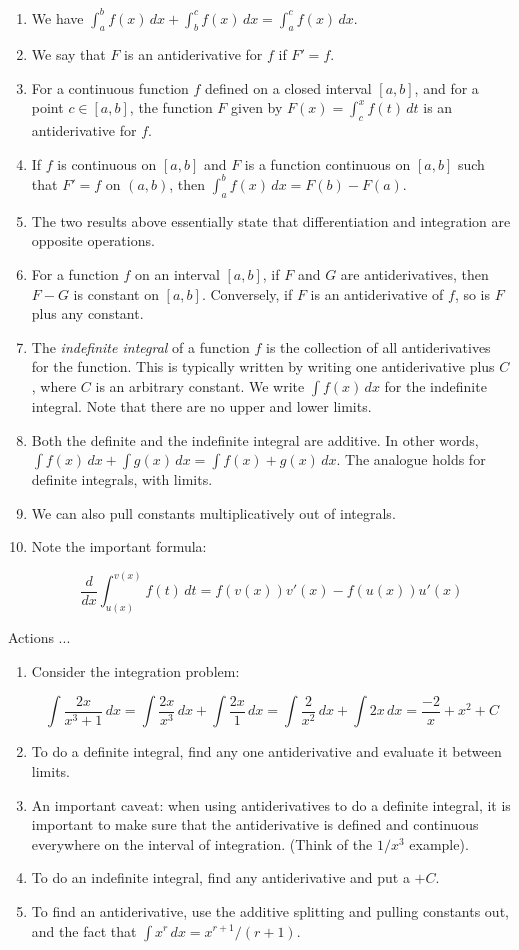 \documentclass[10pt]{amsart}
\begin{document}
\begin{enumerate}
\item We have $\int_a^b f(x) \, dx + \int_b^c f(x) \, dx = \int_a^c
  f(x) \, dx$.
\item We say that $F$ is an antiderivative for $f$ if $F' = f$.
\item For a continuous function $f$ defined on a closed interval
  $[a,b]$, and for a point $c \in [a,b]$, the function $F$ given by
  $F(x) = \int_c^x f(t) \, dt$ is an antiderivative for $f$.
\item If $f$ is continuous on $[a,b]$ and $F$ is a function continuous
  on $[a,b]$ such that $F' = f$ on $(a,b)$, then $\int_a^b f(x) \, dx
  = F(b) - F(a)$.
\item The two results above essentially state that differentiation and
  integration are opposite operations.
\item For a function $f$ on an interval $[a,b]$, if $F$ and $G$ are
  antiderivatives, then $F - G$ is constant on $[a,b]$. Conversely, if
  $F$ is an antiderivative of $f$, so is $F$ plus any constant.
\item The {\em indefinite integral} of a function $f$ is the
  collection of all antiderivatives for the function. This is
  typically written by writing one antiderivative plus $C$, where $C$
  is an arbitrary constant. We write $\int f(x) \, dx$ for the
  indefinite integral. Note that there are no upper and lower limits.
\item Both the definite and the indefinite integral are additive. In
  other words, $\int f(x) \, dx + \int g(x) \, dx = \int f(x) + g(x)
  \, dx$. The analogue holds for definite integrals, with limits.
\item We can also pull constants multiplicatively out of integrals.
\item Note the important formula:

  $$\frac{d}{dx} \int_{u(x)}^{v(x)} f(t) \, dt = f(v(x))v'(x) - f(u(x))u'(x)$$
\end{enumerate}

Actions ...

\begin{enumerate}
\item Consider the integration problem:

  $$\int \frac{2x}{x^3 + 1} \, dx = \int \frac{2x}{x^3} \, dx + \int \frac{2x}{1} \, dx = \int \frac{2}{x^2} \, dx + \int 2x \, dx = \frac{-2}{x} + x^2 + C$$
\item To do a definite integral, find any one antiderivative and
  evaluate it between limits.
\item An important caveat: when using antiderivatives to do a definite
  integral, it is important to make sure that the antiderivative is
  defined and continuous everywhere on the interval of
  integration. (Think of the $1/x^3$ example). 
\item To do an indefinite integral, find any antiderivative and put a
  $+ C$.
\item To find an antiderivative, use the additive splitting and
  pulling constants out, and the fact that $\int x^r \, dx = x^{r +
    1}/(r + 1)$.
\end{enumerate}
\end{document}
